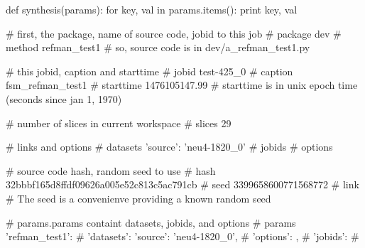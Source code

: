 \begin{python}
def synthesis(params):
  for key, val in params.items():
    print key, val

# first, the package, name of source code, jobid to this job
#   package   dev
#   method    refman_test1
# so, source code is in dev/a_refman_test1.py

# this jobid, caption and starttime
#   jobid     test-425_0
#   caption   fsm_refman_test1
#   starttime 1476105147.99
# starttime is in unix epoch time (seconds since jan 1, 1970)
    
# number of slices in current workspace
#   slices    29

# links and options
#   datasets  {'source': 'neu4-1820_0'}
#   jobids    {}
#   options   {}

# source code hash, random seed to use    
#   hash      32bbbf165d8ffdf09626a005e52c813c5ac791cb
#   seed      3399658600771568772
#   link      {}
# The seed is a convenienve providing a known random seed

# params.params containt datasets, jobids, and options
#   params    {'refman_test1': {
#                'datasets': {'source': 'neu4-1820_0'},
#                'options': {},
#                'jobids': {}}
#             }
\end{python}


